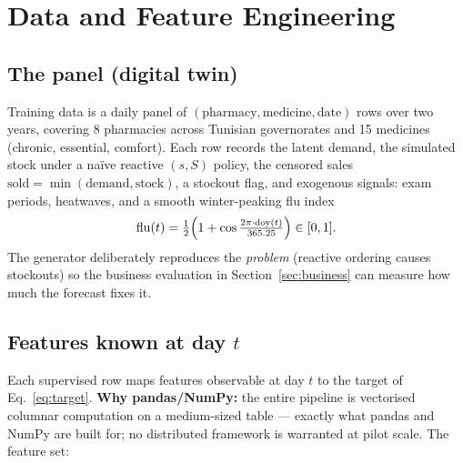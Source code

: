 \documentclass[11pt,a4paper]{article}
\begin{document}
\section{Data and Feature Engineering}

\subsection{The panel (digital twin)}
Training data is a daily panel of $(\text{pharmacy}, \text{medicine}, \text{date})$ rows over two years, covering 8 pharmacies across Tunisian governorates and 15 medicines (chronic, essential, comfort). Each row records the latent demand, the simulated stock under a na\"ive reactive $(s,S)$ policy, the censored sales $\text{sold} = \min(\text{demand}, \text{stock})$, a stockout flag, and exogenous signals: exam periods, heatwaves, and a smooth winter-peaking flu index
\begin{equation}
\mathrm{flu}(t) = \tfrac{1}{2}\Bigl(1 + \cos\tfrac{2\pi \cdot \mathrm{doy}(t)}{365.25}\Bigr) \in [0,1].
\end{equation}
The generator deliberately reproduces the \emph{problem} (reactive ordering causes stockouts) so the business evaluation in Section~\ref{sec:business} can measure how much the forecast fixes it.

\subsection{Features known at day $t$}
Each supervised row maps features observable at day $t$ to the target of Eq.~\eqref{eq:target}. \textbf{Why pandas/NumPy:} the entire pipeline is vectorised columnar computation on a medium-sized table --- exactly what pandas and NumPy are built for; no distributed framework is warranted at pilot scale. The feature set:
\end{document}
